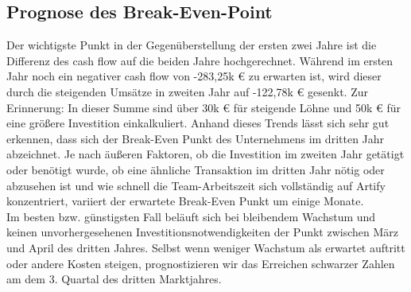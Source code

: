 \documentclass[11pt,a4paper]{report}
\begin{document}
\subsection{Prognose des Break-Even-Point}
Der wichtigste Punkt in der Gegenüberstellung der ersten zwei Jahre ist die Differenz des cash flow auf die beiden Jahre hochgerechnet. Während im ersten Jahr noch ein negativer cash flow von -283,25k € zu erwarten ist, wird dieser durch die steigenden Umsätze in zweiten Jahr auf -122,78k € gesenkt. Zur Erinnerung: In dieser Summe sind über 30k € für steigende Löhne und 50k € für eine größere Investition einkalkuliert. Anhand dieses Trends lässt sich sehr gut erkennen, dass sich der Break-Even Punkt des Unternehmens im dritten Jahr abzeichnet. Je nach äußeren Faktoren, ob die Investition im zweiten Jahr getätigt oder benötigt wurde, ob eine ähnliche Transaktion im dritten Jahr nötig oder abzusehen ist und wie schnell die Team-Arbeitszeit sich vollständig auf Artify konzentriert, variiert der erwartete Break-Even Punkt um einige Monate. \\
Im besten bzw. günstigsten Fall beläuft sich bei bleibendem Wachstum und keinen unvorhergesehenen Investitionsnotwendigkeiten der Punkt zwischen März und April des dritten Jahres. Selbst wenn weniger Wachstum als erwartet auftritt oder andere Kosten steigen, prognostizieren wir das Erreichen schwarzer Zahlen am dem 3. Quartal des dritten Marktjahres.
\end{document}
